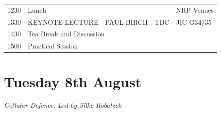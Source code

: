 \documentclass[12pt,]{book}
\theoremstyle{definition}
\theoremstyle{definition}
\theoremstyle{remark}
\begin{document}
\begin{longtable}[]{@{}lll@{}}
\begin{minipage}[t]{0.09\columnwidth}
1230\strut
\end{minipage} & \begin{minipage}[t]{0.39\columnwidth}\raggedright\strut
Lunch\strut
\end{minipage} & \begin{minipage}[t]{0.13\columnwidth}\raggedright\strut
NRP Venues\strut
\end{minipage}\tabularnewline
\begin{minipage}[t]{0.09\columnwidth}\raggedright\strut
1330\strut
\end{minipage} & \begin{minipage}[t]{0.39\columnwidth}\raggedright\strut
KEYNOTE LECTURE - PAUL BIRCH - TBC\strut
\end{minipage} & \begin{minipage}[t]{0.13\columnwidth}\raggedright\strut
JIC G34/35\strut
\end{minipage}\tabularnewline
\begin{minipage}[t]{0.09\columnwidth}\raggedright\strut
1430\strut
\end{minipage} & \begin{minipage}[t]{0.39\columnwidth}\raggedright\strut
Tea Break and Discussion\strut
\end{minipage} & \begin{minipage}[t]{0.13\columnwidth}\raggedright\strut
\strut
\end{minipage}\tabularnewline
\begin{minipage}[t]{0.09\columnwidth}\raggedright\strut
1500\strut
\end{minipage} & \begin{minipage}[t]{0.39\columnwidth}\raggedright\strut
Practical Session\strut
\end{minipage} & \begin{minipage}[t]{0.13\columnwidth}\raggedright\strut
\strut
\end{minipage}\tabularnewline
\bottomrule
\end{longtable}

\section*{Tuesday 8th August}\label{tuesday-8th-august}

\emph{Cellular Defence. Led by Silke Robatzek}
\end{document}
